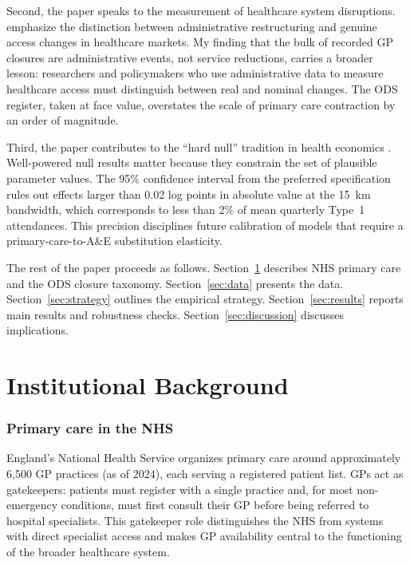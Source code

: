 \documentclass[12pt]{article}
\begin{document}
Second, the paper speaks to the measurement of healthcare system disruptions. \citet{Lafortune2018} emphasize the distinction between administrative restructuring and genuine access changes in healthcare markets. My finding that the bulk of recorded GP closures are administrative events, not service reductions, carries a broader lesson: researchers and policymakers who use administrative data to measure healthcare access must distinguish between real and nominal changes. The ODS register, taken at face value, overstates the scale of primary care contraction by an order of magnitude.

Third, the paper contributes to the ``hard null'' tradition in health economics \citep{Finkelstein2012}. Well-powered null results matter because they constrain the set of plausible parameter values. The 95\% confidence interval from the preferred specification rules out effects larger than 0.02 log points in absolute value at the 15~km bandwidth, which corresponds to less than 2\% of mean quarterly Type~1 attendances. This precision disciplines future calibration of models that require a primary-care-to-A\&E substitution elasticity.

The rest of the paper proceeds as follows. Section~\ref{sec:background} describes NHS primary care and the ODS closure taxonomy. Section~\ref{sec:data} presents the data. Section~\ref{sec:strategy} outlines the empirical strategy. Section~\ref{sec:results} reports main results and robustness checks. Section~\ref{sec:discussion} discusses implications.

\section{Institutional Background}
\label{sec:background}

\subsubsection*{Primary care in the NHS} England's National Health Service organizes primary care around approximately 6,500 GP practices (as of 2024), each serving a registered patient list. GPs act as gatekeepers: patients must register with a single practice and, for most non-emergency conditions, must first consult their GP before being referred to hospital specialists. This gatekeeper role distinguishes the NHS from systems with direct specialist access and makes GP availability central to the functioning of the broader healthcare system.
\end{document}
